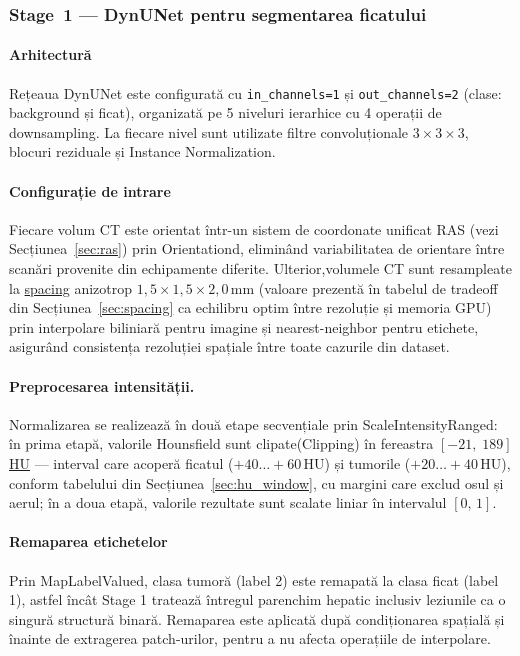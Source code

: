 \documentclass[12pt, a4paper]{report}
\begin{document}
\subsubsection{Stage~1 — DynUNet pentru segmentarea ficatului}


\paragraph{Arhitectură }
Rețeaua DynUNet este configurată cu \texttt{in\_channels=1} și
\texttt{out\_channels=2} (clase: background și ficat), organizată pe
5 niveluri ierarhice cu 4 operații de downsampling.
La fiecare nivel sunt utilizate filtre convoluționale $3\times3\times3$,
blocuri reziduale și Instance Normalization.

\paragraph{ Configurație de intrare}
Fiecare volum CT este orientat într-un sistem de coordonate unificat RAS (vezi Secțiunea~\ref{sec:ras})  prin Orientationd, eliminând variabilitatea de orientare între scanări provenite din echipamente diferite.
Ulterior,volumele CT sunt resampleate la
\hyperref[sec:spacing]{spacing} anizotrop
$1{,}5 \times 1{,}5 \times 2{,}0$\,mm  (valoare prezentă în tabelul de
tradeoff din Secțiunea~\ref{sec:spacing} ca echilibru optim între rezoluție
și memoria GPU) prin interpolare biliniară pentru imagine și nearest-neighbor pentru etichete, asigurând consistența rezoluției spațiale între toate cazurile din dataset.


\paragraph{Preprocesarea intensității.}
Normalizarea se realizează în două etape secvențiale prin ScaleIntensityRanged: în prima etapă, valorile Hounsfield sunt clipate(Clipping) în fereastra $[-21,\; 189]$\hyperref[sec:hu_window]{HU} 
        — interval care acoperă ficatul ($+40 \ldots +60$\,HU) și tumorile
        ($+20 \ldots +40$\,HU), conform tabelului din
        Secțiunea~\ref{sec:hu_window}, cu margini care exclud osul și aerul; în a doua etapă, valorile rezultate sunt scalate liniar în intervalul $[0,\, 1]$.

\paragraph{Remaparea etichetelor}
Prin MapLabelValued, clasa tumoră (label 2) este remapată la clasa ficat (label 1), astfel încât Stage 1 tratează întregul parenchim hepatic inclusiv leziunile ca o singură structură binară. Remaparea este aplicată după condiționarea spațială și înainte de extragerea patch-urilor, pentru a nu afecta operațiile de interpolare.
\end{document}
